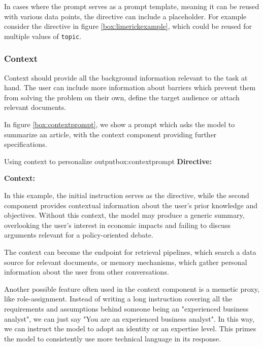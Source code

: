 In cases where the prompt serves as a prompt template, meaning it can be reused with various data points,
the directive can include a placeholder. For example consider the directive in figure \ref{box:limerickexample}, 
which could be reused for multiple values of \texttt{topic}.

\subsubsection{Context}
Context should provide all the background information relevant to the task at hand.
The user can include more information about barriers which prevent them from solving the problem on their own,
define the target audience or attach relevant documents. 

In figure \ref{box:contextprompt}, we show a 
prompt which asks the model to summarize an article, with the context component providing further specifications.

\begin{figurebox}{Using context to personalize output}{box:contextprompt}
    \textbf{Directive:}
    
    
    \textbf{Context:}
    
\end{figurebox}

In this example, the initial instruction serves as the directive, while the second component provides contextual information about the user's prior knowledge and objectives.
Without this context, the model may produce a generic summary, overlooking the user's interest in economic impacts and failing to discuss arguments relevant for a policy-oriented debate.

The context can become the endpoint for retrieval pipelines, which search a data source for 
relevant documents, or memory mechanisms, which gather personal information about the user from other conversations. 

Another possible feature often used in the context component is a memetic proxy\cite{reynolds2021promptprogramminglargelanguage},
like role-assignment. Instead of writing a long instruction covering all the requirements and assumptions 
behind someone being an "experienced business analyst", we can just say "You are an experienced business analyst".
In this way, we can instruct the model to adopt an identity or an expertise level.
This primes the model to consistently use more technical language in its response.

